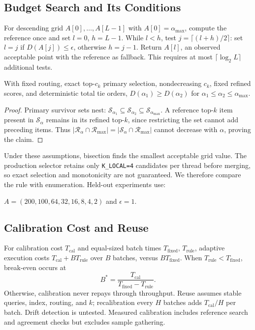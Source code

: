\subsection{Budget Search and Its Conditions}
\label{sec:budget_search}
For descending grid $A[0],\ldots,A[L-1]$ with $A[0]=\alpha_{\max}$, compute the reference once and set $l=0$, $h=L-1$. While $l<h$, test $j=\lceil(l+h)/2\rceil$: set $l=j$ if $D(A[j])\leq\epsilon$, otherwise $h=j-1$. Return $A[l]$, an observed acceptable point with the reference as fallback. This requires at most $\lceil\log_2L\rceil$ additional tests.

\begin{proposition}
\label{prop:budget_monotonicity}
With fixed routing, exact top-$c_k$ primary selection, nondecreasing $c_k$, fixed refined scores, and deterministic total tie orders, $D(\alpha_1)\geq D(\alpha_2)$ for $\alpha_1\leq\alpha_2\leq\alpha_{\max}$.
\end{proposition}
\begin{proof}
Primary survivor sets nest: $\mathcal{S}_{\alpha_1}\subseteq\mathcal{S}_{\alpha_2}\subseteq\mathcal{S}_{\alpha_{\max}}$. A reference top-$k$ item present in $\mathcal{S}_{\alpha}$ remains in its refined top-$k$, since restricting the set cannot add preceding items. Thus $|\mathcal{R}_{\alpha}\cap\mathcal{R}_{\max}|=|\mathcal{S}_{\alpha}\cap\mathcal{R}_{\max}|$ cannot decrease with $\alpha$, proving the claim.
\end{proof}

Under these assumptions, bisection finds the smallest acceptable grid value. The production selector retains only \texttt{K\_LOCAL=4} candidates per thread before merging, so exact selection and monotonicity are not guaranteed. We therefore compare the rule with enumeration. Held-out experiments use: 

$A=(200,100,64,32,16,8,4,2)$ and $\epsilon=1$.

\subsection{Calibration Cost and Reuse}
\label{sec:calibration_cost}
For calibration cost $T_{\mathrm{cal}}$ and equal-sized batch times $T_{\mathrm{fixed}}$, $T_{\mathrm{rule}}$, adaptive execution costs $T_{\mathrm{cal}}+BT_{\mathrm{rule}}$ over $B$ batches, versus $BT_{\mathrm{fixed}}$. When $T_{\mathrm{rule}}<T_{\mathrm{fixed}}$, break-even occurs at
\begin{equation}
B^*=\frac{T_{\mathrm{cal}}}{T_{\mathrm{fixed}}-T_{\mathrm{rule}}}.
\label{eq:calibration_break_even}
\end{equation}
Otherwise, calibration never repays through throughput. Reuse assumes stable queries, index, routing, and $k$; recalibration every $H$ batches adds $T_{\mathrm{cal}}/H$ per batch. Drift detection is untested. Measured calibration includes reference search and agreement checks but excludes sample gathering.